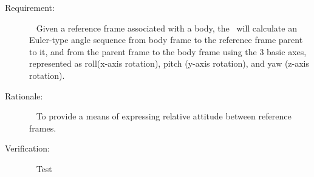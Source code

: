 
%
%
% 
%

\label{reqt:Euler}
\begin{description}
  \item[Requirement:]\ \newline
     Given a reference frame associated with a body, the \EulerDesc\ will calculate an Euler-type angle sequence from body frame to the reference frame parent to it, and from the parent frame to the body frame using the 3 basic axes, represented as roll(x-axis rotation), pitch (y-axis rotation), and yaw (z-axis rotation).
  \item[Rationale:]\ \newline
     To provide a means of expressing relative attitude between reference frames.
  \item[Verification:]\ \newline
     Test
\end{description}


